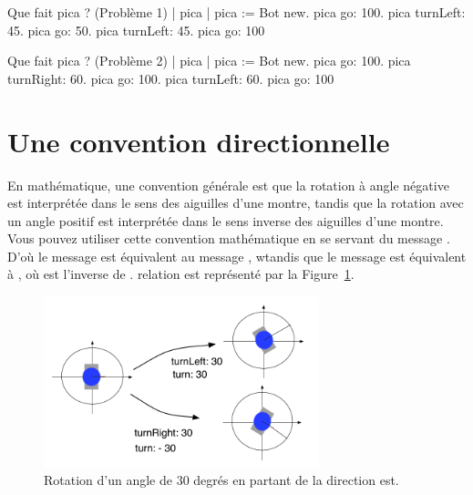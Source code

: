 \documentclass[a4paper,10pt,twoside]{book}
\begin{document}
\begin{script}[myster1]{Que fait pica ? (Probl\`eme 1)}
	| pica | 
	pica := Bot new. 
	pica go: 100. 
	pica turnLeft: 45. 
	pica go: 50. 
	pica turnLeft: 45. 
	pica go: 100 
\end{script}

\begin{script}[myster2]{Que fait pica ? (Probl\`eme 2)}
	| pica | 
	pica := Bot new. 
	pica go: 100. 
	pica turnRight: 60. 
	pica go: 100. 
	pica turnLeft: 60. 
	pica go: 100 
\end{script}


\section{Une convention directionnelle}

En math\'ematique, une convention g\'en\'erale est que la rotation \`a angle n\'egative est interpr\'et\'ee dans le sens des aiguilles 
d'une montre, tandis que la rotation avec un angle positif est interpr\'et\'ee dans le sens inverse des aiguilles d'une montre. 
Vous pouvez utiliser cette convention math\'ematique en se servant du message . D'où le message 
 est \'equivalent au message , wtandis que le message  est \'equivalent \`a , où  est l'inverse de . 
relation est repr\'esent\'e par la Figure~\ref{fig:turnLeftWithMathematicalEq}. 


\begin{figure}
\begin{center}\includegraphics[width=8cm]{turnLeftWithMathematicalEq}
\caption{Rotation d'un angle de 30 degr\'es en partant de la direction est. \label{fig:turnLeftWithMathematicalEq}}
\end{center}
\end{figure}
\end{document}
